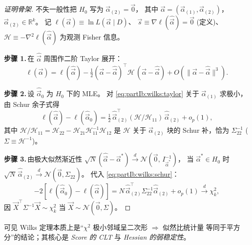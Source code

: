 \begin{proof}[证明骨架]
不失一般性把 $H_0$ 写为 $\vec{\alpha}_{(2)} = \vec{0}$，
其中 $\vec{\alpha}=(\vec{\alpha}_{(1)},\vec{\alpha}_{(2)})$，
$\vec{\alpha}_{(2)}\in\mathbb R^{k}$。
记 $\ell(\vec{\alpha})\equiv \ln L(\vec{\alpha}\mid D)$、
$\vec{s}\equiv\nabla\ell(\hat{\vec{\alpha}})=\vec{0}$ (定义)、
$\mathcal H\equiv -\nabla^2\ell(\hat{\vec{\alpha}})$ 为观测 Fisher 信息。

\textbf{步骤 1.}\,在 $\hat{\vec{\alpha}}$ 周围作二阶 Taylor 展开：
\begin{equation}
  \ell(\vec{\alpha})
  =\ell(\hat{\vec{\alpha}})
   -\tfrac12(\vec{\alpha}-\hat{\vec{\alpha}})^\top
            \mathcal H\,
            (\vec{\alpha}-\hat{\vec{\alpha}})
   +O(\|\vec{\alpha}-\hat{\vec{\alpha}}\|^{3}).
  \label{eq:partIb:wilks:taylor}
\end{equation}

\textbf{步骤 2.}\,设 $\hat{\vec{\alpha}}_0$ 为 $H_0$ 下的 MLE。
对 \eqref{eq:partIb:wilks:taylor} 关于 $\vec{\alpha}_{(1)}$ 求极小，
由 Schur 余子式得
\begin{equation}
  \ell(\hat{\vec{\alpha}})-\ell(\hat{\vec{\alpha}}_0)
  =\tfrac12\,
   \hat{\vec{\alpha}}_{(2)}^{\top}
   (\mathcal H/\mathcal H_{11})\,
   \hat{\vec{\alpha}}_{(2)}
   +o_p(1),
  \label{eq:partIb:wilks:schur}
\end{equation}
其中 $\mathcal H/\mathcal H_{11}=\mathcal H_{22}-\mathcal H_{21}\mathcal H_{11}^{-1}\mathcal H_{12}$
是 $\mathcal H$ 关于 $\vec{\alpha}_{(2)}$ 块的 Schur 补，恰为 $\Sigma_{22}^{-1}$
($\Sigma\equiv\mathcal H^{-1}$)。

\textbf{步骤 3.}\,由极大似然渐近性
$\sqrt{N}(\hat{\vec{\alpha}}-\vec{\alpha}^{*})\xrightarrow{d}\mathcal N(\vec 0,\,I^{-1}_{\vec{\alpha}^{*}})$，
当 $\vec{\alpha}^{*}\in H_0$ 时
$\sqrt{N}\,\hat{\vec{\alpha}}_{(2)}\xrightarrow{d}\mathcal N(\vec 0,\Sigma_{22})$。
代入 \eqref{eq:partIb:wilks:schur}：
\begin{equation}
  -2[\ell(\hat{\vec{\alpha}}_0)-\ell(\hat{\vec{\alpha}})]
  =N\,\hat{\vec{\alpha}}_{(2)}^{\top}\Sigma_{22}^{-1}\hat{\vec{\alpha}}_{(2)}+o_p(1)
  \xrightarrow{d}\chi^2_{k},
  \label{eq:partIb:wilks:final}
\end{equation}
因 $\vec X^{\top}\Sigma^{-1}\vec X\sim\chi^2_{k}$ 当
$\vec X\sim\mathcal N(\vec 0,\Sigma)$。\qedhere
\end{proof}

可见 Wilks 定理本质上是“$\chi^2$ 极小邻域呈二次形 $\Rightarrow$ 似然比统计量
等同于平方分”的结论；其核心是 \emph{Score 的 CLT} 与 \emph{Hessian 的弱稳定性}。

